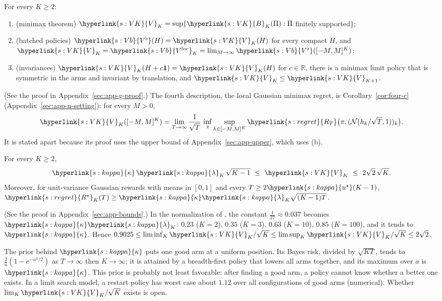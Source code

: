\documentclass[11pt]{article}
\DeclareRobustCommand{\sy}[2]{{\hyperlink{#1}{#2}}}
\newcommand{\R}{\mathbb{R}}
\newcommand{\1}{\mathbf{1}}
\newcommand{\RT}{\sy{s:regret}{R_T}}
\newcommand{\Rs}{\sy{s:regret}{R^\star}}
\newcommand{\VK}{\sy{s:VK}{V}}
\newcommand{\BK}{\sy{s:VK}{B}}
\newcommand{\Vb}{\sy{s:Vb}{V^\flat}}
\newcommand{\Vloc}{\sy{s:Vb}{V^{\mathrm{loc}}}}
\newcommand{\us}{\sy{s:kappa}{u^\star}}
\newcommand{\kap}{\sy{s:kappa}{\kappa}}
\newcommand{\lamK}{\sy{s:kappa}{\lambda}}
\begin{document}
\begin{proposition}\label{prop:four}
For every $K\ge2$:
\begin{enumerate}
\item[(a)] (minimax theorem) $\VK_K=\sup\{\BK_K(\Pi):\Pi$ finitely supported$\}$;
\item[(b)] (batched policies) $\Vb(H)=\VK_K(H)$ for every compact $H$, and $\VK_K=\Vloc_K=\lim_{M\to\infty}\Vb([-M,M]^K)$;
\item[(c)] (invariances) $\VK_K(H+c\1)=\VK_K(H)$ for $c\in\R$, there is a minimax limit policy that is symmetric in the arms and invariant by translation, and $\VK_K\le\VK_{K+1}$.
\end{enumerate}
\end{proposition}

\noindent (See the proof in Appendix~\ref{sec:app-g-proof}.) The fourth description, the local Gaussian minimax regret, is Corollary~\ref{cor:four-c}
(Appendix~\ref{sec:app-u-setting}): for every $M>0$,
\begin{equation*}
\VK_K([-M,M]^K)=\lim_{T\to\infty}\frac1{\sqrt T}\,\inf_\pi\sup_{h\in[-M,M]^K}\RT\big(\pi,(\mathcal N(h_k/\sqrt T,1))_k\big).
\end{equation*}
It is stated apart because its proof uses the upper bound of Appendix~\ref{sec:app-upper}, which uses (b).

\begin{theorem}\label{thm:bounds}
For every $K\ge2$,
\[
\kap\,\lamK_K\,\sqrt{K-1}\ \le\ \VK_K\ \le\ 2\sqrt2\,\sqrt K .
\]
Moreover, for unit-variance Gaussian rewards with means in $[0,1]$ and every $T\ge2\us(K-1)$, $\Rs_K(T)\ge\kap\lamK_K\sqrt{(K-1)T}$.
\end{theorem}

\noindent (See the proof in Appendix~\ref{sec:app-bounds}.) In the normalization of \citet[Theorem~15.2]{LS}, the constant $\frac1{27}\approx0.037$ becomes $\kap\lamK_K$: $0.23$ ($K=2$), $0.35$ ($K=3$), $0.63$ ($K=10$),
$0.85$ ($K=100$), and it tends to $\kap$. Hence $0.9025\le\liminf_K\VK_K/\sqrt K\le\limsup_K\VK_K/\sqrt K\le2\sqrt2$.

\begin{remark}\label{rem:many}
The prior behind $\kap$ puts one good arm at a uniform position. Its Bayes risk, divided by $\sqrt{KT}$, tends to $\frac2a(1-e^{-a^2/2})$ as $T\to\infty$ then $K\to\infty$; it
is attained by a breadth-first policy that lowers all arms together, and its maximum over $a$ is $\kap$. This prior is probably not least favorable: after finding a
good arm, a policy cannot know whether a better one exists. In a limit search model, a restart policy has worst case about $1.12$ over all configurations of good arms
(numerical). Whether $\lim_K\VK_K/\sqrt K$ exists is open.
\end{remark}
\end{document}
